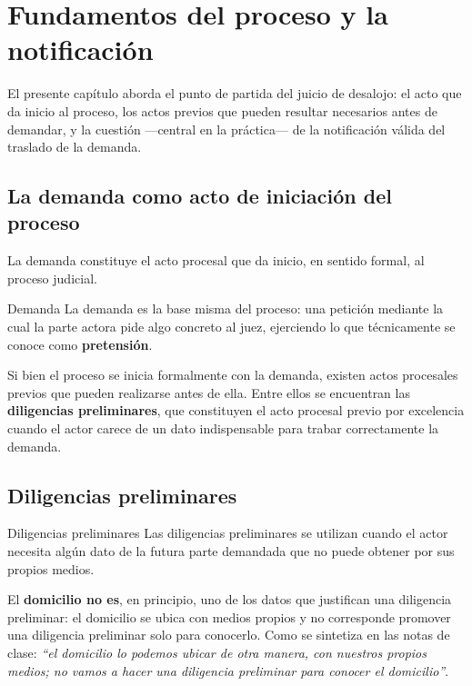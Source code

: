 \documentclass[12pt,oneside]{book}
\begin{document}
\chapter[Fundamentos del proceso y la notificación]{Fundamentos del proceso y la notificación}
\label{ch:fundamentos}

El presente capítulo aborda el punto de partida del juicio de desalojo: el acto que da inicio al proceso, los actos previos que pueden resultar necesarios antes de demandar, y la cuestión —central en la práctica— de la notificación válida del traslado de la demanda.

\section{La demanda como acto de iniciación del proceso}

La demanda constituye el acto procesal que da inicio, en sentido formal, al proceso judicial.

\begin{definition}{Demanda}
La demanda es la base misma del proceso: una petición mediante la cual la parte actora pide algo concreto al juez, ejerciendo lo que técnicamente se conoce como \textbf{pretensión}.
\end{definition}

Si bien el proceso se inicia formalmente con la demanda, existen actos procesales previos que pueden realizarse antes de ella. Entre ellos se encuentran las \textbf{diligencias preliminares}, que constituyen el acto procesal previo por excelencia cuando el actor carece de un dato indispensable para trabar correctamente la demanda.

\section{Diligencias preliminares}

\begin{definition}{Diligencias preliminares}
Las diligencias preliminares se utilizan cuando el actor necesita algún dato de la futura parte demandada que no puede obtener por sus propios medios.
\end{definition}

\begin{important}
El \textbf{domicilio no es}, en principio, uno de los datos que justifican una diligencia preliminar: el domicilio se ubica con medios propios y no corresponde promover una diligencia preliminar solo para conocerlo. Como se sintetiza en las notas de clase: \textit{``el domicilio lo podemos ubicar de otra manera, con nuestros propios medios; no vamos a hacer una diligencia preliminar para conocer el domicilio''}.
\end{important}
\end{document}
